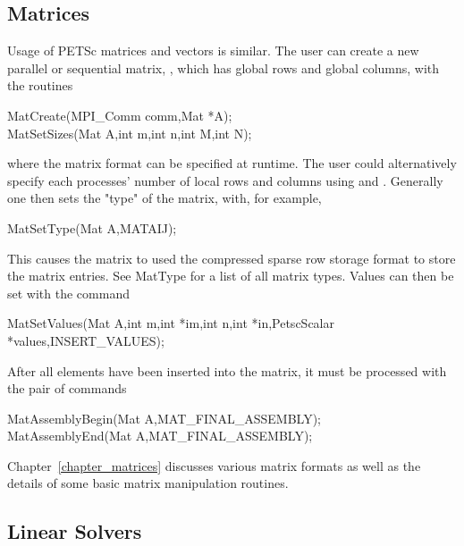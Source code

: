 \subsection*{Matrices}
\label{sec_matintro}

Usage of PETSc matrices and vectors is similar. 
The user can create a new parallel or sequential matrix, , which
has  global rows and  global columns, with the routines
\begin{tabbing}
  MatCreate(MPI\_Comm comm,Mat *A);\\
  MatSetSizes(Mat A,int m,int n,int M,int N);
\end{tabbing}
where the matrix format can be specified at runtime.  The user could
alternatively specify each processes' number of local rows and columns
using  and .
Generally one then sets the "type" of the matrix, with, for example,
\begin{tabbing}
  MatSetType(Mat A,MATAIJ);
\end{tabbing}
This causes the matrix to used the compressed sparse row storage format to store the
matrix entries. See MatType for a list of all matrix types.
Values can then be set with the command
\begin{tabbing}
  MatSetValues(Mat A,int m,int *im,int n,int *in,PetscScalar *values,INSERT\_VALUES);
\end{tabbing}
After  all elements have been inserted into the
matrix, it must be processed with the pair of commands
\begin{tabbing}
  MatAssemblyBegin(Mat A,MAT\_FINAL\_ASSEMBLY);\\
  MatAssemblyEnd(Mat A,MAT\_FINAL\_ASSEMBLY);
\end{tabbing}
Chapter~\ref{chapter_matrices} discusses various matrix formats as
well as the details of some basic matrix manipulation routines.

\subsection*{Linear Solvers}

